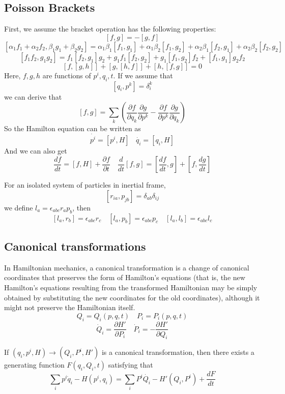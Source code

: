 \subsection{Poisson Brackets}
First, we assume the bracket operation has the following properties:
\[ \left[f,g\right]=-\left[g,f\right] \]
\[\left[\alpha_1 f_1+\alpha_2 f_2,\beta_1 g_1+\beta_2 g_2\right]=\alpha_1 \beta_1\left[f_1,g_1\right]
+\alpha_1 \beta_2\left[f_1,g_2\right]+\alpha_2 \beta_1\left[f_2,g_1\right]+\alpha_2 \beta_2\left[f_2,g_2\right]\]
\[\left[f_1 f_2,g_1 g_2\right]=f_1\left[f_2,g_1\right]g_2+g_1 f_1\left[f_2,g_2\right]+g_1\left[f_1,g_2\right]f_2 +\left[f_1,g_1\right]g_2 f_2 \]
\[\left[f,\left[g,h\right]\right]+\left[g,\left[h,f\right]\right]+\left[h,\left[f,g\right]\right]=0\]
Here, $f,g,h$ are functions of $p^i,q_i,t$.
If we assume that
\[\left [q_i,p^k\right ]=\delta^{k}_{i}\]
we can derive that 
\[ \left[f,g\right]=\sum_k(\frac{\partial f}{\partial q_k} \frac{\partial g}{\partial p^k} - \frac{\partial f}{\partial p^k} \frac{\partial g}{\partial q_k}  )\]
So the Hamilton equation can be written as
\[\dot{p^i}=\left[ p^i,H \right] \ \ \ \ \dot{q_i}=\left[ q_i,H \right]\]
And we can also get
\[\frac{df}{dt} = [f,H] + \frac{\partial f}{\partial t} \quad \frac{d}{dt} [f,g] = [\frac{df}{dt},g] + [f,\frac{dg}{dt}]\]
\begin{example}
 For an isolated system of particles in inertial frame, 
\[[r_{ia},p_{jb}] = \delta_{ab} \delta_{ij}\]
we define $l_a = \epsilon_{abc} r_{a} p_{b}$, then
\[[l_a,r_b] = \epsilon_{abc}r_c \quad [l_a,p_b] = \epsilon_{abc}p_c \quad [l_a,l_b] = \epsilon_{abc}l_c\]
\end{example}

\subsection{Canonical transformations}
In Hamiltonian mechanics, a canonical transformation is a change of canonical coordinates that preserves the form of Hamilton's equations (that is, the new Hamilton's equations resulting from the transformed Hamiltonian may be simply obtained by substituting the new coordinates for the old coordinates), although it might not preserve the Hamiltonian itself. 
\[Q_i = Q_i(p,q,t) \quad P_i=P_i(p,q,t)\]
\[\dot{Q}_i = \frac{\partial H'}{\partial P_i} \quad \dot{P}_i = -\frac{\partial H'}{\partial Q_i}\]

\begin{newprop}
If $(q_i,p^i,H) \to (Q_i,P^i,H')$ is a canonical transformation, then there exists a generating function $F(q_i,Q_i,t)$ satisfying that
\[\sum_i p^i\dot{q}_i-H(p^i,q_i) = \sum_i P^i\dot{Q_i} - H'(Q_i,P^i) + \frac{dF}{dt}\]
\end{newprop}

